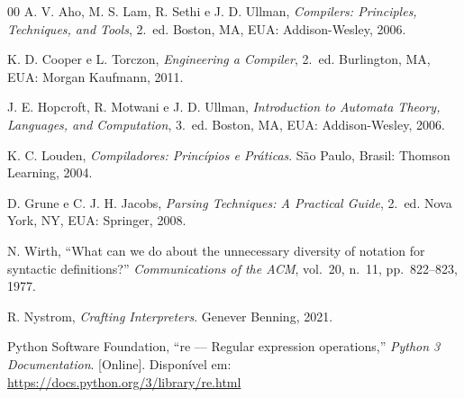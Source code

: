 \documentclass[conference]{IEEEtran}
\begin{document}
\begin{thebibliography}{00}
 A. V. Aho, M. S. Lam, R. Sethi e J. D. Ullman,
\emph{Compilers: Principles, Techniques, and Tools}, 2.\ ed. Boston, MA,
EUA: Addison-Wesley, 2006.

 K. D. Cooper e L. Torczon, \emph{Engineering a
Compiler}, 2.\ ed. Burlington, MA, EUA: Morgan Kaufmann, 2011.

 J. E. Hopcroft, R. Motwani e J. D. Ullman,
\emph{Introduction to Automata Theory, Languages, and Computation}, 3.\ ed.
Boston, MA, EUA: Addison-Wesley, 2006.

 K. C. Louden, \emph{Compiladores: Princípios e
Práticas}. São Paulo, Brasil: Thomson Learning, 2004.

 D. Grune e C. J. H. Jacobs, \emph{Parsing Techniques: A
Practical Guide}, 2.\ ed. Nova York, NY, EUA: Springer, 2008.

 N. Wirth, ``What can we do about the unnecessary
diversity of notation for syntactic definitions?'' \emph{Communications of
the ACM}, vol.~20, n.~11, pp.~822--823, 1977.

 R. Nystrom, \emph{Crafting Interpreters}. Genever
Benning, 2021.

 Python Software Foundation, ``re --- Regular expression
operations,'' \emph{Python 3 Documentation}. [Online]. Disponível em:
\url{https://docs.python.org/3/library/re.html}
\end{thebibliography}
\end{document}
